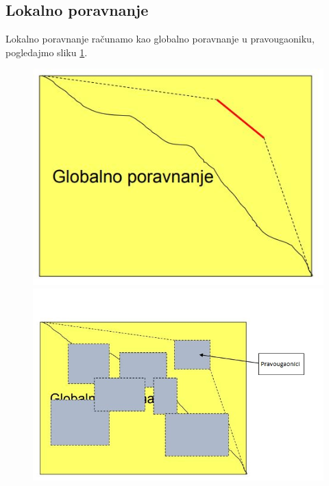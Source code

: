 \subsection{Lokalno poravnanje}

Lokalno poravnanje računamo kao globalno poravnanje u pravougaoniku, pogledajmo sliku \ref{slika:pravougaonici}. \\

\begin{figure}[H]
 \begin{minipage}{0.49\textwidth}
    \includegraphics[width=\linewidth]{poglavlja/5/slike/lokalno_poravnanje_pravougaonici1.JPG}
   \caption{}\label{}
 \end{minipage}
 \hfill
 \begin{minipage}{0.49\textwidth}
   \includegraphics[width=\linewidth]{poglavlja/5/slike/lokalno_poravnanje_pravougaonici2.JPG}
   \caption{}\label{slika:pravougaonici}
 \end{minipage}
\end{figure}

